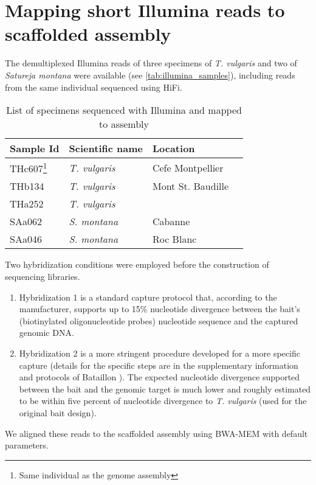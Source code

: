 \section*{Mapping short Illumina reads to scaffolded assembly}\label{sec:illumina}

The demultiplexed Illumina reads of three specimens of \textit{T. vulgaris} and two of \textit{Satureja montana} were available (see \autoref{tab:illumina_samples}), including reads from the same individual sequenced using \ac{HiFi}.\\

\begin{table}[h]
    \begin{minipage}{\linewidth}
    \renewcommand\thefootnote{\thempfootnote}
    \centering
    \begin{tabular}{@{}llll@{}}
    \toprule
    Sample Id & Scientific name & Location     \\ \midrule
    THc607\footnote{Same individual as the genome assembly}    & \textit{T. vulgaris}   &  Cefe Montpellier  \\
    THb134    & \textit{T. vulgaris} & Mont St. Baudille   \\
    THa252    & \textit{T. vulgaris}& \\
    SAa062    & \textit{S. montana} & Cabanne     \\
    SAa046    & \textit{S. montana}  & Roc Blanc    \\ \bottomrule
    \end{tabular}
    \caption{List of specimens sequenced with Illumina and mapped to assembly}
    \label{tab:illumina_samples}
    \end{minipage}
    \end{table}

Two hybridization conditions were employed before the construction of sequencing libraries.\\
\begin{enumerate}
    \item Hybridization 1 is a standard capture protocol that, according to the manufacturer, supports up to 15\% nucleotide divergence between the bait's (biotinylated oligonucleotide probes) nucleotide sequence and the captured genomic DNA. 
    \item Hybridization 2 is a more stringent procedure developed for a more specific capture (details for the specific steps are in the supplementary information and protocols of Bataillon \etal \cite{bataillonGenotypePhenotypeGenetic2022}). The expected nucleotide divergence supported between the bait and the genomic target is much lower and roughly estimated to be within five percent of nucleotide divergence to \textit{T. vulgaris} (used for the original bait design).
\end{enumerate} 

We aligned these reads to the scaffolded assembly using BWA-MEM with default parameters. ~\cite{liAligningSequenceReads2013}